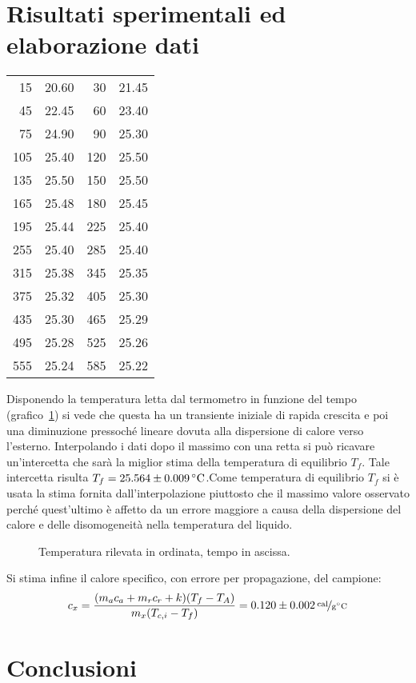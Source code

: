 \documentclass[italian,a4paper]{article}
\begin{document}
\section{Risultati sperimentali ed elaborazione dati}
\begin{table}[t]\centering
\begin{tabular}{rlrl }
15 &20.60 &30 &21.45\\
45 &22.45 &60 &23.40\\
75 &24.90 &90 &25.30\\
105 &25.40 &120 &25.50\\
135 &25.50 &150 &25.50\\
165 &25.48 &180 &25.45\\
195 &25.44 &225 &25.40\\
255 &25.40 &285 &25.40\\
315 &25.38 &345 &25.35\\
375 &25.32 &405 &25.30\\
435 &25.30 &465 &25.29\\
495 &25.28 &525 &25.26\\
555 &25.24 &585 &25.22
\end{tabular}
\end{table}
Disponendo la temperatura letta dal termometro in funzione del tempo (grafico~\ref{temp}) si vede che questa ha un transiente iniziale di rapida crescita e poi una diminuzione pressoché lineare dovuta alla dispersione di calore verso l'esterno. Interpolando i dati dopo il massimo con una retta si può ricavare un'intercetta che sarà la miglior stima della temperatura di equilibrio $T_f$. Tale intercetta risulta $T_f=\unit[25.564\pm0.009]{\celsius}$.Come temperatura di equilibrio $T_f$ si è usata la stima fornita dall'interpolazione piuttosto che il massimo valore osservato perché quest'ultimo è affetto da un errore maggiore a causa della dispersione del calore e delle disomogeneità nella temperatura del liquido.
\begin{figure}[t]\caption{Temperatura rilevata in ordinata, tempo in ascissa.}\label{temp}
\centering 

\end{figure}
Si stima infine il calore specifico, con errore per propagazione, del campione:
\begin{equation*}
 c_x =\dfrac{(m_a c_a + m_r c_r +k)(T_f-T_A)}{m_x(T_{c,i}-T_f)} = \unitfrac[0.120\pm0.002]{cal}{g\celsius}
\end{equation*}
\section{Conclusioni}
\end{document}
